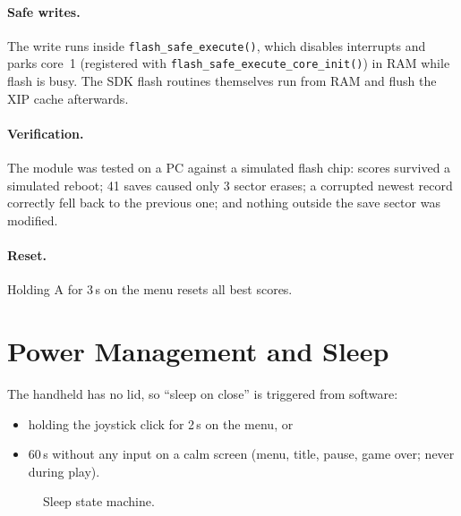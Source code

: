 \documentclass[11pt,a4paper]{article}
\begin{document}
\paragraph{Safe writes.} The write runs inside \texttt{flash\_safe\_execute()},
which disables interrupts and parks core~1 (registered with
\texttt{flash\_safe\_execute\_core\_init()}) in RAM while flash is busy. The SDK
flash routines themselves run from RAM and flush the XIP cache afterwards.

\paragraph{Verification.} The module was tested on a PC against a simulated
flash chip: scores survived a simulated reboot; 41 saves caused only 3 sector
erases; a corrupted newest record correctly fell back to the previous one; and
nothing outside the save sector was modified.

\paragraph{Reset.} Holding A for 3\,s on the menu resets all best scores.

\section{Power Management and Sleep}\label{sec:power}

The handheld has no lid, so ``sleep on close'' is triggered from software:
\begin{itemize}
  \item holding the joystick click for 2\,s on the menu, or
  \item 60\,s without any input on a calm screen (menu, title, pause, game over;
        never during play).
\end{itemize}

\begin{figure}[H]
\centering
{}
\caption{Sleep state machine.}\label{fig:sleepfsm}
\end{figure}
\end{document}
